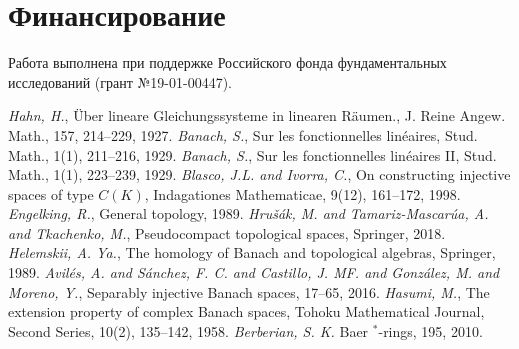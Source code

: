\documentclass[12pt]{article}
\begin{document}

\section{Финансирование}
\label{SectionFunding}
Работа выполнена при поддержке Российского фонда фундаментальных исследований (грант №19-01-00447).


\begin{thebibliography}{999}
    \textit{Hahn, H.},
    {\"U}ber lineare Gleichungssysteme in linearen R{\"a}umen.,
    J. Reine Angew. Math.,
    157,
    214--229,
    1927.
    \textit{Banach, S.},
    Sur les fonctionnelles lin{\'e}aires,
    Stud. Math.,
    1(1),
    211--216,
    1929.
    \textit{Banach, S.},
    Sur les fonctionnelles lin{\'e}aires II,
    Stud. Math.,
    1(1),
    223--239,
    1929.
    \textit{Blasco, J.L. and Ivorra, C.},
    On constructing injective spaces of type $C(K)$,
    Indagationes Mathematicae,
    9(12),
    161--172,
    1998.
    \textit{Engelking, R.},
    General topology,
    1989.
    \textit{Hru{\v{s}}{\'a}k, M. and Tamariz-Mascar{\'u}a, A. and Tkachenko, M.},
    Pseudocompact topological spaces,
    Springer,
    2018.
    \textit{Helemskii, A. Ya.},
    The homology of Banach and topological algebras,
    Springer,
    1989.
    \textit{Avil{\'e}s, A. and S{\'a}nchez, F. C. and Castillo, J. MF. and Gonz{\'a}lez, M. and Moreno, Y.},
    Separably injective Banach spaces,
    17--65,
    2016.
    \textit{Hasumi, M.},
    The extension property of complex Banach spaces,
    Tohoku Mathematical Journal, Second Series,
    10(2),
    135--142,
    1958.
    \textit{Berberian, S. K.}
    Baer $^*$-rings,
    195,
    2010.

\end{thebibliography}
\end{document}
